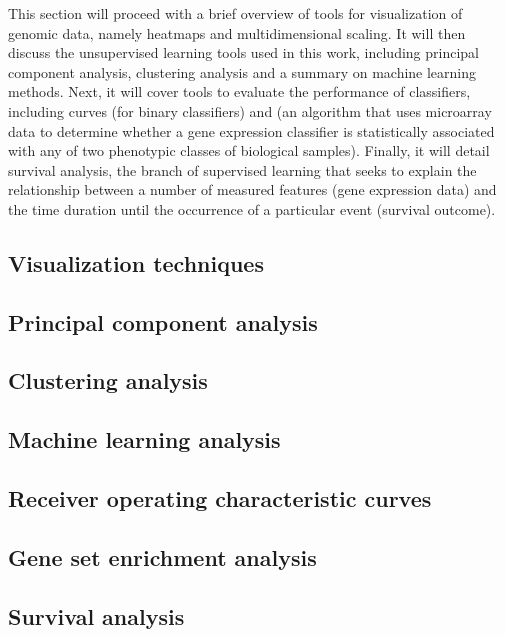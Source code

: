 
\medskip

This section will proceed with a brief overview of tools for visualization of
genomic data, namely heatmaps and multidimensional scaling.  It will then
discuss the unsupervised learning tools used in this work, including principal
component analysis, clustering analysis and a summary on machine learning
methods.  Next, it will cover tools to evaluate the performance of classifiers,
including  curves (for binary classifiers) and 
(an algorithm that uses microarray data to determine whether a gene expression
classifier is statistically associated with any of two phenotypic classes of
biological samples).  Finally, it will detail survival analysis, the branch of
supervised learning that seeks to explain the relationship between a number of
measured features (gene expression data) and the time duration until the
occurrence of a particular event (survival outcome).

\subsection{Visualization techniques}
\label{sec:methods-visualization}

\subsection{Principal component analysis}
\label{sec:methods-pc}

\subsection{Clustering analysis}
\label{sec:methods-clustering}

\subsection{Machine learning analysis}
\label{sec:methods-machine-learning}

\subsection{Receiver operating characteristic curves}
\label{sec:methods-roc}

\subsection{Gene set enrichment analysis}
\label{sec:methods-gsea}

\subsection{Survival analysis}
\label{sec:methods-survival-analysis}








